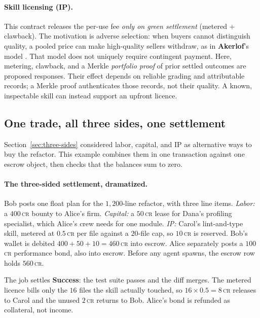 \documentclass[11pt,a4paper]{article}
\theoremstyle{definition}
\theoremstyle{definition}
\theoremstyle{remark}
\begin{document}
\paragraph{Skill licensing (IP).} This contract releases the per-use fee
\emph{only on green settlement} (metered $+$ clawback). The motivation is
adverse selection: when buyers cannot distinguish quality, a pooled price can
make high-quality sellers withdraw, as in \textbf{Akerlof}'s model
. That model does not uniquely require contingent payment.
Here, metering, clawback, and a Merkle \emph{portfolio proof} of prior settled
outcomes are proposed responses. Their effect depends on reliable grading and
attributable records; a Merkle proof authenticates those records, not their
quality. A known, inspectable skill can instead support an upfront licence.

\subsection{One trade, all three sides, one settlement}\label{sec:one-settlement}

Section~\ref{sec:three-sides} considered labor, capital, and IP as alternative
ways to buy the refactor. This example combines them in one transaction against
one escrow object, then checks that the balances sum to zero.

\paragraph{The three-sided settlement, dramatized.} Bob posts one float plan for
the $1{,}200$-line refactor, with three line items. \emph{Labor:} a $400$\,\textsc{cr}
bounty to Alice's firm. \emph{Capital:} a $50$\,\textsc{cr} lease for Dana's
profiling specialist, which Alice's crew needs for one module. \emph{IP:} Carol's
lint-and-type skill, metered at $0.5$\,\textsc{cr} per file against a $20$-file cap,
so $10$\,\textsc{cr} is reserved. Bob's wallet is debited
$400+50+10 = 460$\,\textsc{cr} into escrow. Alice separately posts a
$100$\,\textsc{cr} performance bond, also into escrow. Before any agent spawns, the
escrow row holds $560$\,\textsc{cr}.

The job settles \textbf{Success}: the test suite passes and the diff merges. The
metered licence bills only the $16$ files the skill actually touched, so
$16 \times 0.5 = 8$\,\textsc{cr} releases to Carol and the unused $2$\,\textsc{cr}
returns to Bob. Alice's bond is refunded as collateral, not income.
\end{document}
